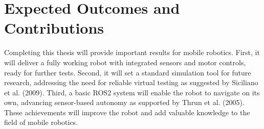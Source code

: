 \section{Expected Outcomes and Contributions}

Completing this thesis will provide important results for mobile robotics. First,
it will deliver a fully working robot with integrated sensors and motor controls,
ready for further tests. Second, it will set a standard simulation tool for future
research, addressing the need for reliable virtual testing as suggested by
Siciliano et al. (2009). Third, a basic ROS2 system will enable the robot to navigate
on its own, advancing sensor-based autonomy as supported by Thrun et al. (2005).
These achievements will improve the robot and add valuable knowledge to the field
of mobile robotics.
